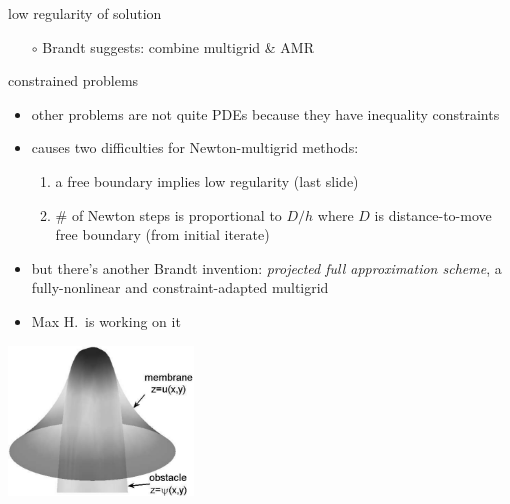 \documentclass[hide notes,intlimits,usenames,dvipsnames]{beamer}
\begin{document}
\begin{frame}{low regularity of solution}
\begin{itemize}
\begin{minipage}[t]{75mm}
\begin{itemize}
    \vspace{-2mm}
    \item[$\circ$] Brandt suggests: combine multigrid \& AMR
    \end{itemize}
\end{minipage} \quad
\begin{minipage}[t]{20mm}
\vspace{0mm}
\begin{tikzpicture}[scale=1.1]  \end{tikzpicture}
\end{minipage}
\end{itemize}

\end{frame}


\begin{frame}{constrained problems}
\begin{itemize}
\item other problems are not quite PDEs because they have inequality constraints
\item causes two difficulties for Newton-multigrid methods:
    \begin{enumerate}
    \item a free boundary implies low regularity (last slide)
    \item \# of Newton steps is proportional to $D/h$ where $D$ is distance-to-move free boundary (from initial iterate)
    \end{enumerate}
\item but there's another Brandt invention: \emph{projected full approximation scheme}, a fully-nonlinear and constraint-adapted multigrid
\item Max H.~is working on it
\end{itemize}

\begin{center}
\includegraphics[width=0.37\textwidth]{figs/classicalobs}
\end{center}
\end{frame}
\end{document}

